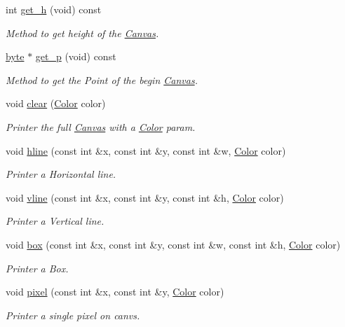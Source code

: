 \begin{DoxyCompactItemize}
int \hyperlink{classCanvas_ab26c7ab91a0a9069895285a314bc8418}{get\+\_\+h} (void) const
\begin{DoxyCompactList}\small\item\em Method to get height of the \hyperlink{classCanvas}{Canvas}. \end{DoxyCompactList}\item 
\hyperlink{canvas_8h_a0c8186d9b9b7880309c27230bbb5e69d}{byte} $\ast$ \hyperlink{classCanvas_aa9f9b173d57058ea827a0134c937d0e1}{get\+\_\+p} (void) const
\begin{DoxyCompactList}\small\item\em Method to get the Point of the begin \hyperlink{classCanvas}{Canvas}. \end{DoxyCompactList}\item 
void \hyperlink{classCanvas_a0205269b201aed71f21b8f613cd66333}{clear} (\hyperlink{structColor}{Color} color)
\begin{DoxyCompactList}\small\item\em Printer the full \hyperlink{classCanvas}{Canvas} with a \hyperlink{structColor}{Color} param. \end{DoxyCompactList}\item 
void \hyperlink{classCanvas_a3095d5ff2670c5dc9939454198865ceb}{hline} (const int \&x, const int \&y, const int \&w, \hyperlink{structColor}{Color} color)
\begin{DoxyCompactList}\small\item\em Printer a Horizontal line. \end{DoxyCompactList}\item 
void \hyperlink{classCanvas_af81ae19142bc132665e053ce5de15211}{vline} (const int \&x, const int \&y, const int \&h, \hyperlink{structColor}{Color} color)
\begin{DoxyCompactList}\small\item\em Printer a Vertical line. \end{DoxyCompactList}\item 
void \hyperlink{classCanvas_a6e1c6baa6fb92cd3de1726b67b51aa38}{box} (const int \&x, const int \&y, const int \&w, const int \&h, \hyperlink{structColor}{Color} color)
\begin{DoxyCompactList}\small\item\em Printer a Box. \end{DoxyCompactList}\item 
void \hyperlink{classCanvas_aa189a705135fb14f427747084763143a}{pixel} (const int \&x, const int \&y, \hyperlink{structColor}{Color} color)
\begin{DoxyCompactList}\small\item\em Printer a single pixel on canvs. \end{DoxyCompactList}\end{DoxyCompactItemize}


